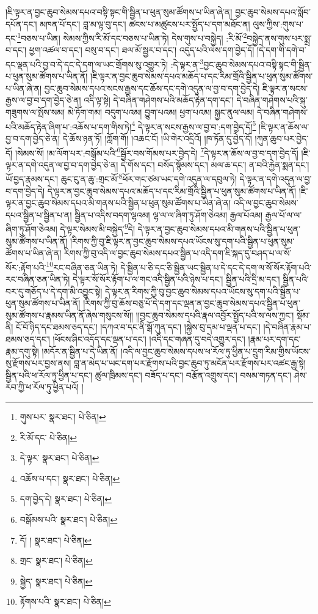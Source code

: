།ཇི་ལྟར་ན་བྱང་ཆུབ་སེམས་དཔའ་བསྟི་སྟང་གི་སྦྱིན་པ་ཕུན་སུམ་ཚོགས་པ་ཡིན་ཞེ་ན། བྱང་ཆུབ་སེམས་དཔའ་སློབ་དཔོན་དང་། མཁན་པོ་དང་། བླ་མ་ལྟ་བུ་དང་། ཚངས་པ་མཚུངས་པར་སྤྱོད་པ་དག་མཐོང་ན། ལུས་ཀྱིས་:གུས་པ་དང་\footnote{གུས་པར་  སྣར་ཐང་།  པེ་ཅིན། }བཅས་པ་ཡིན། སེམས་ཀྱིས་རི་མོ་དང་བཅས་པ་ཡིན་ཏེ། དེས་གུས་པ་བསྐྱེད། :རི་མོ་\footnote{རི་མོ་དང་  པེ་ཅིན། }བསྐྱེད་ནས་གུས་པར་སྨྲ་བ་དང་། ཕྱག་འཚལ་བ་དང་། བསུ་བ་དང་། ཐལ་མོ་སྦྱར་བ་དང་། འདུད་པའི་ལས་དག་བྱེད་དོ། །དེ་དག་གི་དགེ་བ་དང་ལྡན་པའི་བྱ་བ་དེ་དང་དེ་དག་ལ་ཡང་གྲོགས་སུ་འགྱུར་ཏེ། :དེ་ལྟར་ན་\footnote{དེ་ལྟར་  སྣར་ཐང་།  པེ་ཅིན། }བྱང་ཆུབ་སེམས་དཔའ་བསྟི་སྟང་གི་སྦྱིན་པ་ཕུན་སུམ་ཚོགས་པ་ཡིན་ནོ། །ཇི་ལྟར་ན་བྱང་ཆུབ་སེམས་དཔའ་མཆོད་པ་དང་རིམ་གྲོའི་སྦྱིན་པ་ཕུན་སུམ་ཚོགས་པ་ཡིན་ཞེ་ན། བྱང་ཆུབ་སེམས་དཔའ་སངས་རྒྱས་དང་ཆོས་དང་དགེ་འདུན་ལ་བྱ་བ་དག་བྱེད་དེ། ཇི་ལྟར་ན་སངས་རྒྱས་ལ་བྱ་བ་དག་བྱེད་ཅེ་ན། འདི་ལྟ་སྟེ། དེ་བཞིན་གཤེགས་པའི་མཆོད་རྟེན་དག་དང་། དེ་བཞིན་གཤེགས་པའི་སྐུ་གཟུགས་ལ་སྤོས་སམ། མེ་ཏོག་གམ། བདུག་པའམ། བྱུག་པའམ། ཕྱག་པའམ། སྐྱང་ནུལ་ལམ། དེ་བཞིན་གཤེགས་པའི་མཆོད་རྟེན་ཞིག་པ་:འཆོས་པ་དག་གིས་ཏེ།\footnote{འཆོས་པ་དང་།  སྣར་ཐང་།  པེ་ཅིན། } དེ་ལྟར་ན་སངས་རྒྱས་ལ་བྱ་བ་:དག་བྱེད་དོ།\footnote{དག་བྱེད་དེ།  སྣར་ཐང་།  པེ་ཅིན། } །ཇི་ལྟར་ན་ཆོས་ལ་བྱ་བ་དག་བྱེད་ཅེ་ན། དེ་ཆོས་ཉན་ཏོ། །ཀློག་གོ། །འཆང་ངོ། །ཡི་གེར་འདྲིའོ། །ཁ་ཏོན་དུ་བྱེད་དོ། །ཀུན་ཆུབ་པར་བྱེད་དོ། །སེམས་སོ། །མ་ལོག་པར་:བསྒོམ་པའི་\footnote{བསྒོམས་པའི་  སྣར་ཐང་།  པེ་ཅིན། }སྦྱོར་བས་གོམས་པར་བྱེད་དེ། \footnote{དོ། །   སྣར་ཐང་།  པེ་ཅིན། }དེ་ལྟར་ན་ཆོས་ལ་བྱ་བ་དག་བྱེད་དོ། །ཇི་ལྟར་ན་དགེ་འདུན་ལ་བྱ་བ་དག་བྱེད་ཅེ་ན། དེ་གོས་དང་། བསོད་སྙོམས་དང་། མལ་ཆ་དང་། ན་བའི་རྐྱེན་སྨན་དང་། ཡོ་བྱད་རྣམས་དང་། ཆུང་ངུ་ན་ཆུ་:གྲང་མོ་\footnote{གྲང་  སྣར་ཐང་།  པེ་ཅིན། }ཕོར་གང་ཙམ་ཡང་དགེ་འདུན་ལ་དབུལ་ཏེ། དེ་ལྟར་ན་དགེ་འདུན་ལ་བྱ་བ་དག་བྱེད་དེ། དེ་ལྟར་ན་བྱང་ཆུབ་སེམས་དཔའ་མཆོད་པ་དང་རིམ་གྲོའི་སྦྱིན་པ་ཕུན་སུམ་ཚོགས་པ་ཡིན་ནོ། །ཇི་ལྟར་ན་བྱང་ཆུབ་སེམས་དཔའ་མི་གནས་པའི་སྦྱིན་པ་ཕུན་སུམ་ཚོགས་པ་ཡིན་ཞེ་ན། འདི་ལ་བྱང་ཆུབ་སེམས་དཔའ་སྦྱིན་པ་སྦྱིན་པ་ན། སྦྱིན་པ་འདིས་བདག་ལྷའམ། ལྷ་ལ་ལ་ཞིག་ཏུ་ཤོག་ཅེའམ། རྒྱལ་པོའམ། རྒྱལ་པོ་ལ་ལ་ཞིག་ཏུ་ཤོག་ཅེའམ། དེ་ལྟར་སེམས་མི་བསྐྱེད་\footnote{སྐྱེད་  སྣར་ཐང་།  པེ་ཅིན། }དེ། དེ་ལྟར་ན་བྱང་ཆུབ་སེམས་དཔའ་མི་གནས་པའི་སྦྱིན་པ་ཕུན་སུམ་ཚོགས་པ་ཡིན་ནོ། །རིགས་ཀྱི་བུ་ཇི་ལྟར་ན་བྱང་ཆུབ་སེམས་དཔའ་ཡོངས་སུ་དག་པའི་སྦྱིན་པ་ཕུན་སུམ་ཚོགས་པ་ཡིན་ཞེ་ན། རིགས་ཀྱི་བུ་འདི་ལ་བྱང་ཆུབ་སེམས་དཔའ་སྦྱིན་པ་འདི་དག་ཇི་སྐད་དུ་བཤད་པ་ལ་སོ་སོར་:རྟོག་པའི་\footnote{རྟོགས་པའི་  སྣར་ཐང་།  པེ་ཅིན། }རང་བཞིན་ཅན་ཡིན་ཏེ། དེ་སྦྱིན་པ་ཅི་དང་ཅི་སྦྱིན་ཡང་སྦྱིན་པ་དེ་དང་དེ་དག་ལ་སོ་སོར་རྟོག་པའི་རང་བཞིན་ཅན་ཡིན་ཏེ། དེ་ལྟར་སོ་སོར་རྟོག་པ་ལ་གང་འདི་སྦྱིན་པའི་ཉེས་པ་དང་། སྦྱིན་པའི་དྲི་མ་དང་། སྦྱིན་པའི་བར་དུ་གཅོད་པ་དེ་དག་མི་འབྱུང་སྟེ། དེ་ལྟར་ན་རིགས་ཀྱི་བུ་བྱང་ཆུབ་སེམས་དཔའ་ཡོངས་སུ་དག་པའི་སྦྱིན་པ་ཕུན་སུམ་ཚོགས་པ་ཡིན་ནོ། །རིགས་ཀྱི་བུ་ཆོས་བཅུ་པོ་དེ་དག་དང་ལྡན་ན་བྱང་ཆུབ་སེམས་དཔའ་སྦྱིན་པ་ཕུན་སུམ་ཚོགས་པ་རྣམས་ཡིན་ནོ་ཞེས་གསུངས་སོ།། །།བྱང་ཆུབ་སེམས་དཔའི་རྣལ་འབྱོར་སྤྱོད་པའི་ས་ལས་ཀྱང་། སྡོམ་ནི། ངོ་བོ་ཉིད་དང་ཐམས་ཅད་དང་། །དཀའ་བ་དང་ནི་སྒོ་ཀུན་དང་། །སྐྱེས་བུ་དམ་པ་ལྡན་པ་དང་། །དེ་བཞིན་རྣམ་པ་ཐམས་ཅད་དང་། །ཕོངས་ཤིང་འདོད་དང་ལྡན་པ་དང་། །འདི་དང་གཞན་དུ་བདེ་འགྱུར་དང་། །རྣམ་པར་དག་དང་རྣམ་དགུ་སྟེ། །མདོར་ན་སྦྱིན་པ་དེ་ཡིན་ནོ། །འདི་ལ་བྱང་ཆུབ་སེམས་དཔས་ཕ་རོལ་ཏུ་ཕྱིན་པ་དྲུག་རིམ་གྱིས་ཡོངས་སུ་རྫོགས་པར་བྱས་ནས། བླ་ན་མེད་པ་ཡང་དག་པར་རྫོགས་པའི་བྱང་ཆུབ་ཏུ་མངོན་པར་རྫོགས་པར་འཚང་རྒྱ་སྟེ། སྦྱིན་པའི་ཕ་རོལ་ཏུ་ཕྱིན་པ་དང་། ཚུལ་ཁྲིམས་དང་། བཟོད་པ་དང་། བརྩོན་འགྲུས་དང་། བསམ་གཏན་དང་། ཤེས་རབ་ཀྱི་ཕ་རོལ་ཏུ་ཕྱིན་པའོ། །
